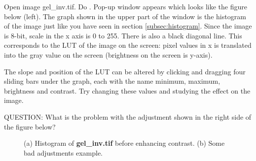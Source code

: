 \begin{indentexercise}{1}
Open image gel\_inv.tif. Do . 
Pop-up window appears which looks like the
figure below (left). The graph shown in the upper part of the window is 
the
histogram of the image just like you have seen in section \ref{subsec:histogram}. 
Since the image is 8-bit, scale in the x axis is 0 to 255.
There is also a black diagonal line. This corresponds to the LUT of the
image on the screen: pixel values in x is translated into the gray
value on the screen (brightness on the screen is y-axis). 

The slope and position of the LUT can be altered by clicking and dragging
four sliding bars under the graph, each with the name minimum, maximum,
brightness and contrast. Try changing these values and studying the
effect on the image. 

QUESTION: What is the problem with the adjustment shown in the
right side of the figure below?

\begin{figure}[htbp]
 \centering
 \caption{ (a) Histogram of \textbf{gel\_inv.tif} before enhancing contrast. (b) Some bad adjustments example. }
 \label{fig:quizEnhanceContrast}
\end{figure} 

\end{indentexercise}

